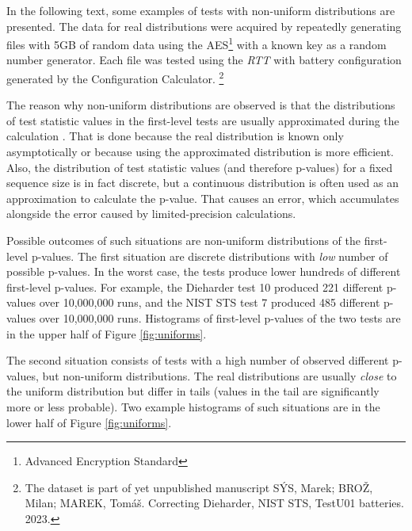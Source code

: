 \documentclass[
  digital,     %
  oneside,     %
  nosansbold,  %
  nocolorbold, %
  nolof,         %
  nolot,         %
]{fithesis4}
\begin{document}
In the following text, some examples of tests with non-uniform distributions are presented. The data for real distributions were acquired by repeatedly generating files with 5GB of random data using the AES\footnote{Advanced Encryption Standard} with a known key as a random number generator. Each file was tested using the \emph{RTT} with battery configuration generated by the Configuration Calculator. \footnote{The dataset is part of yet unpublished manuscript SÝS, Marek; BROŽ, Milan; MAREK, Tomáš. Correcting Dieharder, NIST STS, TestU01 batteries. 2023.}

The reason why non-uniform distributions are observed is that the distributions of test statistic values in the first-level tests are usually approximated during the calculation \cite[p. 7]{bad_day}. That is done because the real distribution is known only asymptotically or because using the approximated distribution is more efficient. Also, the distribution of test statistic values (and therefore p-values) for a fixed sequence size is in fact discrete, but a continuous distribution is often used as an approximation to calculate the p-value. That causes an error, which accumulates alongside the error caused by limited-precision calculations. 

Possible outcomes of such situations are non-uniform distributions of the first-level p-values. The first situation are discrete distributions with \emph{low} number of possible p-values. In the worst case, the tests produce lower hundreds of different first-level p-values. For example, the Dieharder test 10 produced 221 different p-values over 10,000,000 runs, and the NIST STS test 7 produced 485 different p-values over 10,000,000 runs. Histograms of first-level p-values of the two tests are in the upper half of Figure \ref{fig:uniforms}.

The second situation consists of tests with a high number of observed different p-values, but non-uniform distributions. The real distributions are usually \emph{close} to the uniform distribution but differ in tails (values in the tail are significantly more or less probable). Two example histograms of such situations are in the lower half of Figure \ref{fig:uniforms}.
\end{document}
